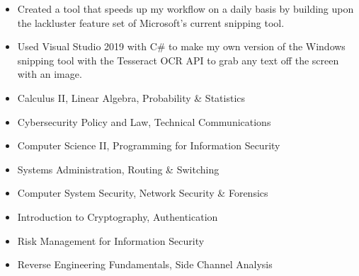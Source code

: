 \documentclass[10pt,a4paper,ragged2e]{altacv}
\begin{document}
\smallskip
\smallskip
{}
\begin{itemize}
\item Created a tool that speeds up my workflow on a daily basis by building upon the lackluster feature set of Microsoft's current snipping tool.
\smallskip
\item Used Visual Studio 2019 with C\# to make my own version of the Windows snipping tool with the Tesseract OCR API to grab any text off the screen with an image.
\end{itemize}
\smallskip
\smallskip


\smallskip
\begin{itemize}
\item Calculus II, Linear Algebra, Probability \& Statistics
\smallskip
\item Cybersecurity Policy and Law, Technical Communications
\smallskip
\item Computer Science II, Programming for Information Security
\smallskip
\item Systems Administration, Routing \& Switching
\smallskip
\item Computer System Security, Network Security \& Forensics
\smallskip
\item Introduction to Cryptography, Authentication
\smallskip
\item Risk Management for Information Security
\smallskip
\item Reverse Engineering Fundamentals, Side Channel Analysis
\smallskip
\end{itemize}



\end{document}
